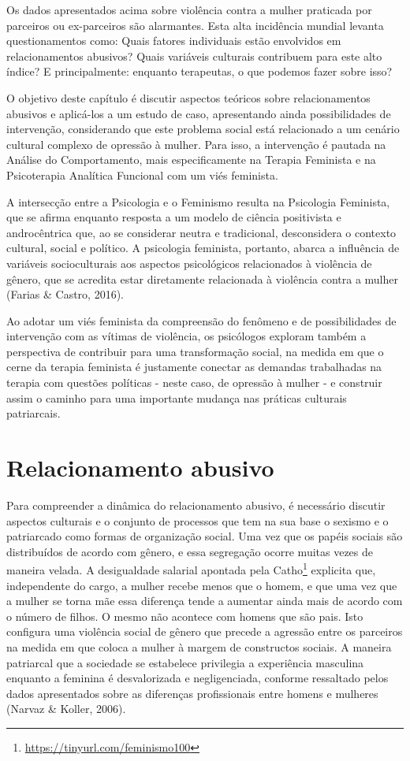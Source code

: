 Os dados apresentados acima sobre violência contra a mulher praticada por parceiros ou ex-parceiros são alarmantes. Esta alta incidência mundial levanta questionamentos como: Quais fatores individuais estão envolvidos em relacionamentos abusivos? Quais variáveis culturais contribuem para este alto índice? E principalmente: enquanto terapeutas, o que podemos fazer sobre isso?

O objetivo deste capítulo é discutir aspectos teóricos sobre relacionamentos abusivos e aplicá-los a um estudo de caso, apresentando ainda possibilidades de intervenção, considerando que este problema social está relacionado a um cenário cultural complexo de opressão à mulher. Para isso, a intervenção é pautada na Análise do Comportamento, mais especificamente na Terapia Feminista e na Psicoterapia Analítica Funcional com um viés feminista.

A intersecção entre a Psicologia e o Feminismo resulta na Psicologia Feminista, que se afirma enquanto resposta a um modelo de ciência positivista e androcêntrica que, ao se considerar neutra e tradicional, desconsidera o contexto cultural, social e político. A psicologia feminista, portanto, abarca a influência de variáveis socioculturais aos aspectos psicológicos relacionados à violência de gênero, que se acredita estar diretamente relacionada à violência contra a mulher (Farias \& Castro, 2016). 

Ao adotar um viés feminista da compreensão do fenômeno e de possibilidades de intervenção com as vítimas de violência, os psicólogos exploram também a perspectiva de contribuir para uma transformação social, na medida em que o cerne da terapia feminista é justamente conectar as demandas trabalhadas na terapia com questões políticas - neste caso, de opressão à mulher - e construir assim o caminho para uma importante mudança nas práticas culturais patriarcais.

\section*{Relacionamento abusivo}

Para compreender a dinâmica do relacionamento abusivo, é necessário discutir aspectos culturais e o conjunto de processos que tem na sua base o sexismo e o patriarcado como formas de organização social. Uma vez que os papéis sociais são distribuídos de acordo com gênero, e essa segregação ocorre muitas vezes de maneira velada. A desigualdade salarial apontada pela Catho\footnote{\url{https://tinyurl.com/feminismo100}} explicita que, independente do cargo, a mulher recebe menos que o homem, e que uma vez que a mulher se torna mãe essa diferença tende a aumentar ainda mais de acordo com o número de filhos. O mesmo não acontece com homens que são pais. Isto configura uma violência social de gênero que precede a agressão entre os parceiros na medida em que coloca a mulher à margem de constructos sociais. A maneira patriarcal que a sociedade se estabelece privilegia a experiência masculina enquanto a feminina é desvalorizada e negligenciada, conforme ressaltado pelos dados apresentados sobre as diferenças profissionais entre homens e mulheres (Narvaz \& Koller, 2006).

